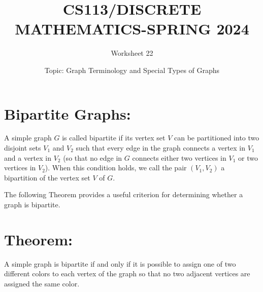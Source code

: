 \documentclass{exam}
\title{CS113/DISCRETE MATHEMATICS-SPRING 2024}
\author{Worksheet 22}
\date{Topic: Graph Terminology and Special Types of Graphs}
\begin{document}
\maketitle
\vspace{5mm}
\begin{center}
\end{center}
\vspace{5mm}


\vspace{5mm}

\vspace{5mm}

\section{Bipartite Graphs:}
A simple graph $G$ is called bipartite if its vertex set $V$ can be partitioned into two disjoint sets $V_1$ and $V_2$ such that every edge in the graph connects a vertex in $V_1$ and a vertex in $V_2$ (so that no edge in $G$ connects either two vertices in $V_1$ or two vertices in $V_2$). When this condition holds, we call the pair $(V_1, V_2)$ a bipartition of the vertex set $V$ of $G$.

The following Theorem provides a useful criterion for determining whether a graph is bipartite.

\section{Theorem:}
A simple graph is bipartite if and only if it is possible to assign one of two different colors to
each vertex of the graph so that no two adjacent vertices are assigned the same color.

\vspace{5mm}
\end{document}
